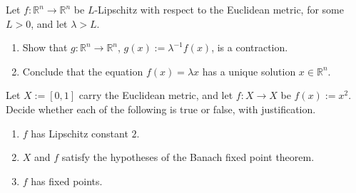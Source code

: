 \begin{exercise}[Contraction mappings and the equation $f(x) = \lambda x$]
\label{ex:banach_fixed_point_linear}
Let $f : \mathbb{R}^n \to \mathbb{R}^n$ be $L$-Lipschitz with respect to the Euclidean metric, for
some $L > 0$, and let $\lambda > L$.
\begin{enumerate}[label=\textbf{(\alph*)}]
  \item Show that $g : \mathbb{R}^n \to \mathbb{R}^n$, $g(x) := \lambda^{-1} f(x)$, is a contraction.
  \item Conclude that the equation $f(x) = \lambda x$ has a unique solution $x \in \mathbb{R}^n$.
\end{enumerate}
\end{exercise}

\begin{exercise}
\label{ex:banach_hypotheses_true_false}
Let $X := [0,1]$ carry the Euclidean metric, and let $f : X \to X$ be $f(x) := x^2$. Decide whether
each of the following is true or false, with justification.
\begin{enumerate}[label=\textbf{(\alph*)}]
  \item $f$ has Lipschitz constant $2$.
  \item $X$ and $f$ satisfy the hypotheses of the Banach fixed point theorem.
  \item $f$ has fixed points.
\end{enumerate}
\end{exercise}

